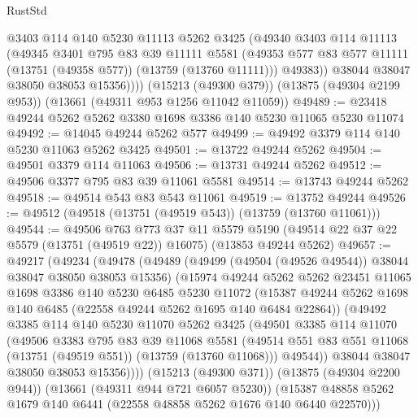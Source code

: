 \begin{lexlean}{RustStd}
\begin{coremodule}
            @3403
            @114
            @140
            @5230
            @11113
            @5262
            @3425
            (@49340
              @3403
              @114
              @11113
              (@49345
                @3401
                @795
                @83
                @39
                @11111
                @5581
                (@49353 @577 @83 @577 @11111 (@13751 (@49358 @577)) (@13759 (@13760 @11111)))
                @49383))
            @38044
            @38047
            @38050
            @38053
            @15356))))
    (@15213 (@49300 @379))
    (@13875 (@49304 @2199 @953))
    (@13661 (@49311 @953 @1256 @11042 @11059))
@49489 := @23418 @49244 @5262 @5262 @3380 @1698 @3386 @140 @5230 @11065 @5230 @11074
@49492 := @14045 @49244 @5262 @577
@49499 := @49492 @3379 @114 @140 @5230 @11063 @5262 @3425
@49501 := @13722 @49244 @5262
@49504 := @49501 @3379 @114 @11063
@49506 := @13731 @49244 @5262
@49512 := @49506 @3377 @795 @83 @39 @11061 @5581
@49514 := @13743 @49244 @5262
@49518 := @49514 @543 @83 @543 @11061
@49519 := @13752 @49244
@49526 := @49512 (@49518 (@13751 (@49519 @543)) (@13759 (@13760 @11061)))
@49544 := @49506
    @763
    @773
    @37
    @11
    @5579
    @5190
    (@49514 @22 @37 @22 @5579 (@13751 (@49519 @22)) @16075)
    (@13853 @49244 @5262)
@49657 := @49217
    (@49234
      (@49478
        (@49489
          (@49499 (@49504 (@49526 @49544)) @38044 @38047 @38050 @38053 @15356)
          (@15974
            @49244
            @5262
            @5262
            @23451
            @11065
            @1698
            @3386
            @140
            @5230
            @6485
            @5230
            @11072
            (@15387 @49244 @5262 @1698 @140 @6485 (@22558 @49244 @5262 @1695 @140 @6484 @22864))
            (@49492
              @3385
              @114
              @140
              @5230
              @11070
              @5262
              @3425
              (@49501
                @3385
                @114
                @11070
                (@49506
                  @3383
                  @795
                  @83
                  @39
                  @11068
                  @5581
                  (@49514 @551 @83 @551 @11068 (@13751 (@49519 @551)) (@13759 (@13760 @11068)))
                  @49544))
              @38044
              @38047
              @38050
              @38053
              @15356))))
      (@15213 (@49300 @371))
      (@13875 (@49304 @2200 @944))
      (@13661 (@49311 @944 @721 @6057 @5230))
      (@15387 @48858 @5262 @1679 @140 @6441 (@22558 @48858 @5262 @1676 @140 @6440 @22570)))

\end{coremodule}
\end{lexlean}
